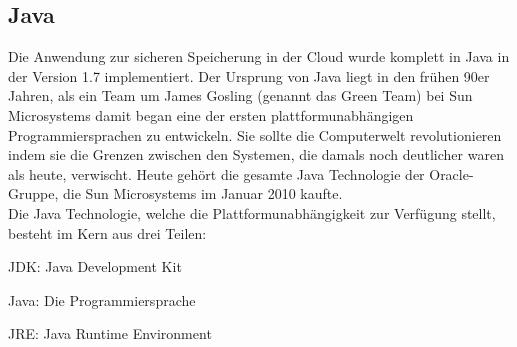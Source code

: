 \documentclass[12pt,a4paper,bibliography=totocnumbered,listof=totocnumbered]{scrartcl}
\begin{document}
\subsection{Java}\label{JavaV}
Die Anwendung zur sicheren Speicherung in der Cloud wurde komplett in Java in der Version 1.7 implementiert. Der Ursprung von Java liegt in den frühen 90er Jahren, als ein Team um James Gosling (genannt das Green Team) bei Sun Microsystems damit began eine der ersten plattformunabhängigen Programmiersprachen zu entwickeln. Sie sollte die Computerwelt revolutionieren indem sie die Grenzen zwischen den Systemen, die damals noch deutlicher waren als heute, verwischt. Heute gehört die gesamte Java Technologie der Oracle-Gruppe, die Sun Microsystems im Januar 2010 kaufte.\\
Die Java Technologie, welche die Plattformunabhängigkeit zur Verfügung stellt, besteht im Kern aus drei Teilen:
\begin{compactitem}
	\item JDK: Java Development Kit
	\item Java: Die Programmiersprache
	\item JRE: Java Runtime Environment
\end{compactitem}
\end{document}

